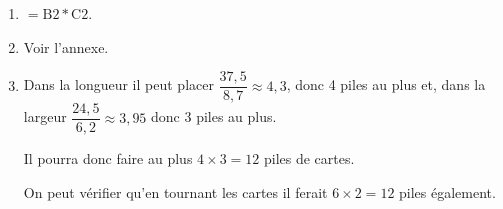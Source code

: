 
\medskip

%
%

\begin{enumerate}
\item %
$=\text{B}2 * \text{C}2$.
\item %
Voir l'annexe.
\item %

%
%

Dans la longueur il peut placer $\dfrac{37,5}{8,7} \approx 4,3$, donc 4 piles au plus et, 
dans la largeur $\dfrac{24,5}{6,2} \approx 3,95$ donc 3 piles au plus.

Il pourra donc faire au plus $4 \times 3 = 12$ piles de cartes.

On peut vérifier qu'en tournant les cartes il ferait $6 \times 2 = 12$ piles également.
\end{enumerate}
